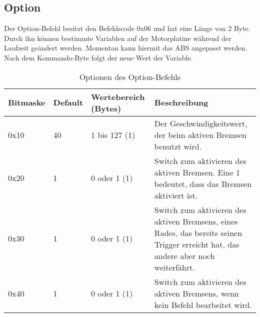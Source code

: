 \subsection{Option}
Der Option-Befehl besitzt den Befehlscode 0x06 und hat eine Länge von 2 Byte.
Durch ihn können bestimmte Variablen auf der Motorplatine während der Laufzeit
geändert werden. Momentan kann hiermit das ABS angepasst werden. Nach dem
Kommando-Byte folgt der neue Wert der Variable.
\begin{table}[htb]
\begin{center}
	\begin{tabularx}{\linewidth}{|l|l|l|X|}
		\hline
		\textbf{Bitmaske} & \textbf{Default} & \textbf{Wertebereich (Bytes)} & \textbf{Beschreibung} \\
		\hline
		\hline
		0x10 & 40 & 1 bis 127 (1) & Der Geschwindigkeitswert, der beim aktiven Bremsen benutzt wird. \\
		\hline
		0x20 & 1 & 0 oder 1 (1) & Switch zum aktivieren des aktiven Bremsen. Eine 1 bedeutet, dass das Bremsen aktiviert ist. \\
		\hline
		0x30 & 1 & 0 oder 1 (1) & Switch zum aktivieren des aktiven Bremsens, eines Rades, das bereits seinen Trigger erreicht hat, das andere aber noch weiterfährt. \\
		\hline
		0x40 & 1 & 0 oder 1 (1) & Switch zum aktivieren des aktiven Bremsens, wenn kein Befehl bearbeitet wird. \\
		\hline
	\end{tabularx}
	\caption{\label{protocol_option} Optionen des Option-Befehls}
\end{center}
\end{table}
